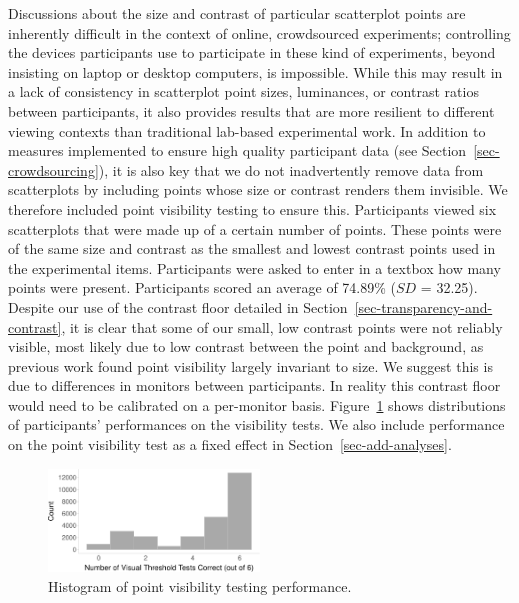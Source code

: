 \documentclass[manuscript, review, anonymous, screen]{acmart}
\begin{document}
Discussions about the size and contrast of particular scatterplot points
are inherently difficult in the context of online, crowdsourced
experiments; controlling the devices participants use to participate in
these kind of experiments, beyond insisting on laptop or desktop
computers, is impossible. While this may result in a lack of consistency
in scatterplot point sizes, luminances, or contrast ratios between
participants, it also provides results that are more resilient to
different viewing contexts than traditional lab-based experimental work.
In addition to measures implemented to ensure high quality participant
data (see Section~\ref{sec-crowdsourcing}), it is also key that we do
not inadvertently remove data from scatterplots by including points
whose size or contrast renders them invisible. We therefore included
point visibility testing to ensure this. Participants viewed six
scatterplots that were made up of a certain number of points. These
points were of the same size and contrast as the smallest and lowest
contrast points used in the experimental items. Participants were asked
to enter in a textbox how many points were present. Participants scored
an average of 74.89\% (\(SD\) = 32.25). Despite our use of the contrast
floor detailed in Section~\ref{sec-transparency-and-contrast}, it is
clear that some of our small, low contrast points were not reliably
visible, most likely due to low contrast between the point and
background, as previous work \citep{strain_2023b} found point visibility
largely invariant to size. We suggest this is due to differences in
monitors between participants. In reality this contrast floor would need
to be calibrated on a per-monitor basis. Figure~\ref{fig-VT-hist} shows
distributions of participants' performances on the visibility tests. We
also include performance on the point visibility test as a fixed effect
in Section~\ref{sec-add-analyses}.

\begin{figure}

\includegraphics[width=0.5\textwidth,height=\textheight]{size_and_contrast_new_files/figure-pdf/fig-VT-hist-1.pdf} \hfill{}

\caption{\label{fig-VT-hist}Histogram of point visibility testing
performance.}

\end{figure}
\end{document}
